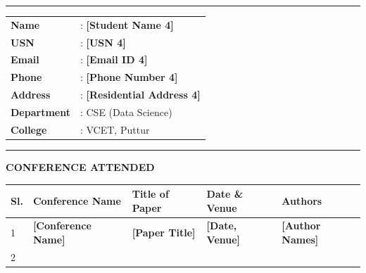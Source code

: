 \documentclass[12pt,a4paper]{report}
\begin{document}
\vspace{0.5cm}

\noindent\rule{\textwidth}{0.4pt}
\begin{minipage}[t]{0.25\textwidth}
\centering
\vspace{0.2cm}
\end{minipage}
\hfill
\begin{minipage}[t]{0.72\textwidth}
\vspace{0.2cm}
\begin{tabular}{ll}
\textbf{Name}       & : \textbf{[Student Name 4]} \\
\textbf{USN}        & : \textbf{[USN 4]} \\
\textbf{Email}      & : \textbf{[Email ID 4]} \\
\textbf{Phone}      & : \textbf{[Phone Number 4]} \\
\textbf{Address}    & : \textbf{[Residential Address 4]} \\
\textbf{Department} & : CSE (Data Science) \\
\textbf{College}    & : VCET, Puttur \\
\end{tabular}
\end{minipage}
\vspace{0.2cm}
\noindent\rule{\textwidth}{0.4pt}

\newpage
\thispagestyle{plain}
\begin{center}
{\Large\bfseries CONFERENCE ATTENDED}
\end{center}

\vspace{0.5cm}

\begin{center}
\begin{tabular}{|p{0.8cm}|p{3.5cm}|p{3.5cm}|p{2.5cm}|p{2.5cm}|}
\hline
\textbf{Sl.} & \textbf{Conference Name} & \textbf{Title of Paper} & \textbf{Date \& Venue} & \textbf{Authors} \\
\hline
1 & \textbf{[Conference Name]} & \textbf{[Paper Title]} & \textbf{[Date, Venue]} & \textbf{[Author Names]} \\[20pt]
\hline
2 & & & & \\[20pt]
\hline
\end{tabular}
\end{center}

\vspace{1cm}
\begin{center}
\end{center}

\end{document}

